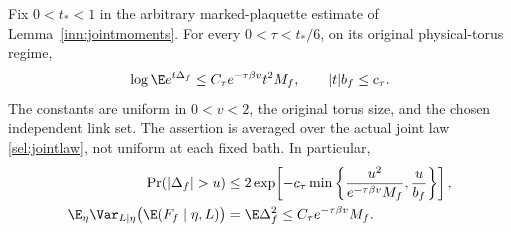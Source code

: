 \begin{theorem}
\label{sel:labelbernstein}
Fix \(0<t_*<1\) in the arbitrary marked-plaquette estimate of Lemma~\ref{inn:jointmoments}. For every \(0<\tau<t_*/6\), on its original physical-torus regime,
\begin{equation}
 \log\E e^{t\Delta_f}
 \le C_\tau e^{-\tau\beta v}t^2M_f,\qquad
 |t|b_f\le c_\tau .
 \label{sel:labelcgf}
\end{equation}
The constants are uniform in \(0<v<2\), the original torus size, and the chosen independent link set. The assertion is averaged over the actual joint law \eqref{sel:jointlaw}, not uniform at each fixed bath. In particular,
\begin{align}
 \Pr(|\Delta_f|>u)
 &\le2\exp\!\left[-c_\tau
      \min\left\{\frac{u^2}{e^{-\tau\beta v}M_f},
                       \frac{u}{b_f}\right\}\right],
 \label{sel:labeltail}\\
 \E_\eta\Var_{L\mid\eta}\bigl(\E(F_f\mid\eta,L)\bigr)
 &=\E\Delta_f^2\le C_\tau e^{-\tau\beta v}M_f .
 \label{sel:labelvariance}
\end{align}
\end{theorem}
